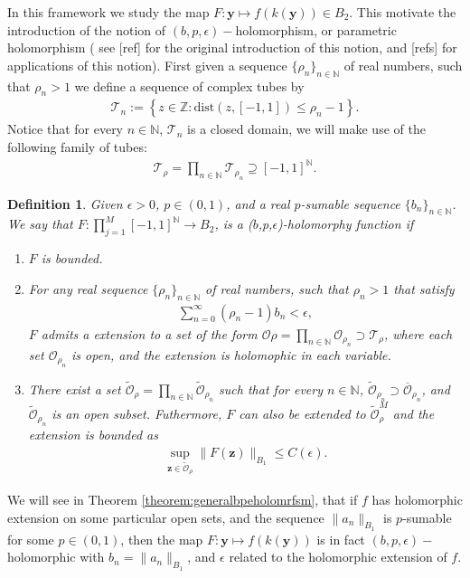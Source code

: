 \documentclass{article}
\newtheorem{definition}[theorem]{Definition}
\newcommand{\todo}[1]{{\color{red}[#1]}}
\newcommand{\IN}{{\mathbb N}}
\newcommand{\IZ}{{\mathbb Z}}
\newcommand{\by}{\bm{y}}
\begin{document}
In this framework we study the map $F : \by \mapsto f(k(\by)) \in  B_2$. This motivate the introduction of the notion of $(b,p,\epsilon)-$holomorphism, or parametric holomorphism ( see  \todo{ref} for the original introduction of this notion, and \todo{refs} for applications of this notion). First given a sequence $\{\rho_n\}_{n \in \IN}$ of real numbers, such that $\rho_n  >1$ we define a sequence of complex tubes by 
\begin{align*}
\mathcal{T}_n := \left\lbrace z \in \IZ : \text{dist}(z,[-1,1]) \leq \rho_n-1 \right\rbrace.
\end{align*}
Notice that for every $n \in \IN$, $\mathcal{T}_n$ is a closed domain, we will make use of the following family of tubes: 
\begin{align*}
\mathcal{T}_{\rho} = \prod_{n \in \IN} \mathcal{T}_{\rho_n} \supseteq [-1,1]^{\IN}.
\end{align*}
\begin{definition}
\label{def:bepholom}
Given $\epsilon >0$, $p \in (0,1)$, and a real $p$-sumable sequence $\{b_n\}_{n \in \IN}$. We say that $F:\prod_{j=1}^M[-1,1]^\IN\rightarrow B_2$, is a ($b$,p,$\epsilon$)-holomorphy function if
\begin{enumerate}
\item $F$ is bounded.
\item 
For any real sequence $\{\rho_n\}_{n \in \IN}$ of real numbers, such that $\rho_n >1$ that satisfy 
\begin{align*}
\sum_{n =0}^\infty (\rho_n -1) b_n < \epsilon, 
\end{align*}
$F$ admits a extension to a set of the form $\mathcal{O}\rho =  \prod_{n \in \IN} \mathcal{O}_{\rho_n} \supset \mathcal{T}_\rho$, where each set $\mathcal{O}_{\rho_n}$ is open, and the extension is holomophic in each variable. 
\item 
There exist a set $\widetilde{\mathcal{O}}_\rho =  \prod_{n \in \IN} \widetilde{\mathcal{O}}_{\rho_n}$ such that for every $n \in \IN$, $\widetilde{\mathcal{O}}_{\rho_n} \supset \overline{\mathcal{O}}_{\rho_n}$, and $\widetilde{\mathcal{O}}_{\rho_n}$ is an open subset. Futhermore, $F$ can also be extended to $\widetilde{\mathcal{O}}_\rho^M$ and the extension is bounded as 
\begin{align*}
\sup_{\mathbf{z} \in \widetilde{\mathcal{O}}_\rho } \| F(\mathbf{z})\|_{B_1} \leq C(\epsilon).
\end{align*}
\end{enumerate}
\end{definition}
We will see in Theorem \ref{theorem:generalbpeholomrfsm}, that  if $f$ has holomorphic extension on some particular open sets, and the sequence $\|a_n\|_{B_1}$ is $p$-sumable for some $p \in(0,1)$, then the map $F :\by \mapsto f(k(\by))$ is in fact $(b,p,\epsilon)-$holomorphic with  $b_n = \|a_n\|_{B_1}$, and $\epsilon$ related to the holomorphic extension of $f$. 
\end{document}
